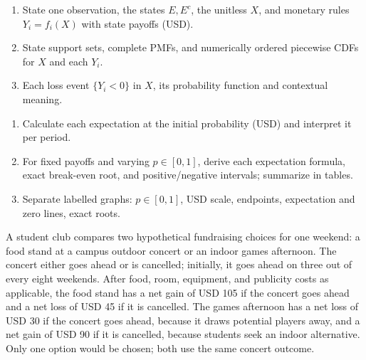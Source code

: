 \vspace{-3mm}
\noindent\begin{minipage}[t]{.49\linewidth}\vspace{0pt}
\begin{enumerate}[label=\arabic*.,itemsep=2pt,topsep=2pt,leftmargin=1.5em]
\item State one observation, the states $E,E^c$, the unitless $X$, and monetary rules $Y_i=f_i(X)$ with state payoffs (USD).
\item State support sets, complete PMFs, and numerically ordered piecewise CDFs for $X$ and each $Y_i$.
\item Each loss event $\{Y_i<0\}$ in $X$, its probability function and contextual meaning.
\end{enumerate}
\end{minipage}\hfill
\begin{minipage}[t]{.49\linewidth}\vspace{0pt}
\begin{enumerate}[label=\arabic*.,itemsep=2pt,topsep=2pt,leftmargin=1.5em]
\item Calculate each expectation at the initial probability (USD) and interpret it per period.
\item For fixed payoffs and varying $p\in[0,1]$, derive each expectation formula, exact break-even root, and positive/negative intervals; summarize in tables.
\item Separate labelled graphs: $p\in[0,1]$, USD scale, endpoints, expectation and zero lines, exact roots.
\end{enumerate}
\end{minipage}\par


\vspace{-3mm}
A student club compares two hypothetical fundraising choices for one weekend: a food
stand at a campus outdoor concert or an indoor games afternoon. The concert either goes
ahead or is cancelled; initially, it goes ahead on three out of every eight weekends.
After food, room, equipment, and publicity costs as applicable, the food stand has a net
gain of USD 105 if the concert goes ahead and a net loss of USD 45 if it is cancelled.
The games afternoon has a net loss of USD 30 if the concert goes ahead, because it draws
potential players away, and a net gain of USD 90 if it is cancelled, because students
seek an indoor alternative. Only one option would be chosen; both use the same concert outcome.


